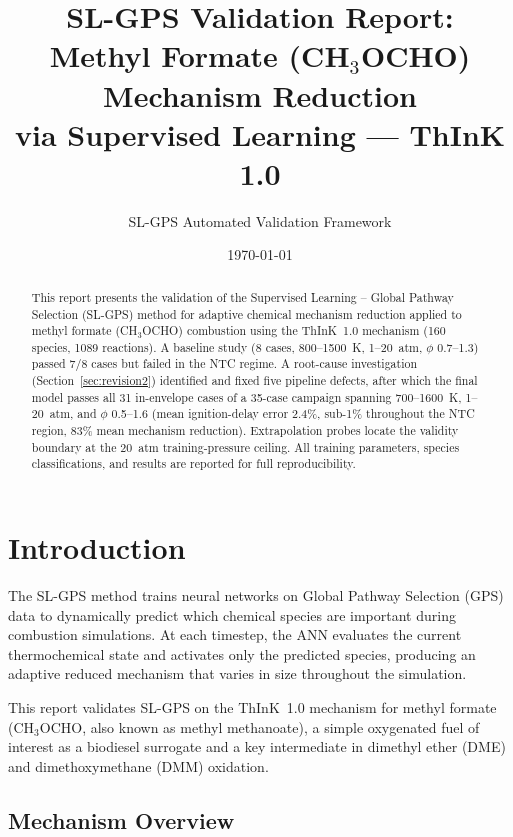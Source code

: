 \documentclass[11pt,a4paper]{article}
\title{SL-GPS Validation Report:\\Methyl Formate (CH$_3$OCHO) Mechanism Reduction\\via Supervised Learning --- ThInK 1.0}
\author{SL-GPS Automated Validation Framework}
\date{\today}
\begin{document}
\maketitle

\begin{abstract}
This report presents the validation of the Supervised Learning -- Global Pathway Selection (SL-GPS) method for adaptive chemical mechanism reduction applied to methyl formate (CH$_3$OCHO) combustion using the ThInK~1.0 mechanism (160 species, 1089 reactions). A baseline study (8 cases, 800--1500~K, 1--20~atm, $\phi$ 0.7--1.3) passed 7/8 cases but failed in the NTC regime. A root-cause investigation (Section~\ref{sec:revision2}) identified and fixed five pipeline defects, after which the final model passes all 31 in-envelope cases of a 35-case campaign spanning 700--1600~K, 1--20~atm, and $\phi$ 0.5--1.6 (mean ignition-delay error 2.4\%, sub-1\% throughout the NTC region, 83\% mean mechanism reduction). Extrapolation probes locate the validity boundary at the 20~atm training-pressure ceiling. All training parameters, species classifications, and results are reported for full reproducibility.
\end{abstract}

\tableofcontents
\newpage

\section{Introduction}

The SL-GPS method trains neural networks on Global Pathway Selection (GPS) data to dynamically predict which chemical species are important during combustion simulations. At each timestep, the ANN evaluates the current thermochemical state and activates only the predicted species, producing an adaptive reduced mechanism that varies in size throughout the simulation.

This report validates SL-GPS on the ThInK~1.0 mechanism \cite{think1} for methyl formate (CH$_3$OCHO, also known as methyl methanoate), a simple oxygenated fuel of interest as a biodiesel surrogate and a key intermediate in dimethyl ether (DME) and dimethoxymethane (DMM) oxidation.

\subsection{Mechanism Overview}
\end{document}

